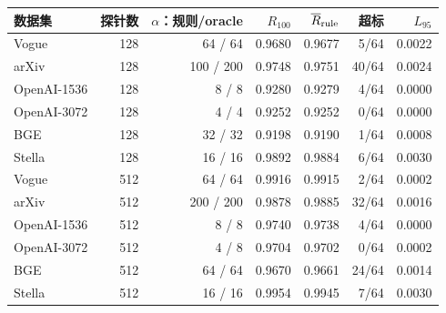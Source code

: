 \begin{tabular}{@{}lrrrrrr@{}}
\toprule
数据集 & 探针数 & $\alpha$：规则/oracle & $R_{100}$ & $\overline{R}_{\rm rule}$ & 超标 & $L_{95}$ \\
\midrule
Vogue & 128 & 64 / 64 & 0.9680 & 0.9677 & 5/64 & 0.0022 \\
arXiv & 128 & 100 / 200 & 0.9748 & 0.9751 & 40/64 & 0.0024 \\
OpenAI-1536 & 128 & 8 / 8 & 0.9280 & 0.9279 & 4/64 & 0.0000 \\
OpenAI-3072 & 128 & 4 / 4 & 0.9252 & 0.9252 & 0/64 & 0.0000 \\
BGE & 128 & 32 / 32 & 0.9198 & 0.9190 & 1/64 & 0.0008 \\
Stella & 128 & 16 / 16 & 0.9892 & 0.9884 & 6/64 & 0.0030 \\
Vogue & 512 & 64 / 64 & 0.9916 & 0.9915 & 2/64 & 0.0002 \\
arXiv & 512 & 200 / 200 & 0.9878 & 0.9885 & 32/64 & 0.0016 \\
OpenAI-1536 & 512 & 8 / 8 & 0.9740 & 0.9738 & 4/64 & 0.0000 \\
OpenAI-3072 & 512 & 4 / 8 & 0.9704 & 0.9702 & 0/64 & 0.0002 \\
BGE & 512 & 64 / 64 & 0.9670 & 0.9661 & 24/64 & 0.0014 \\
Stella & 512 & 16 / 16 & 0.9954 & 0.9945 & 7/64 & 0.0030 \\
\bottomrule
\end{tabular}
